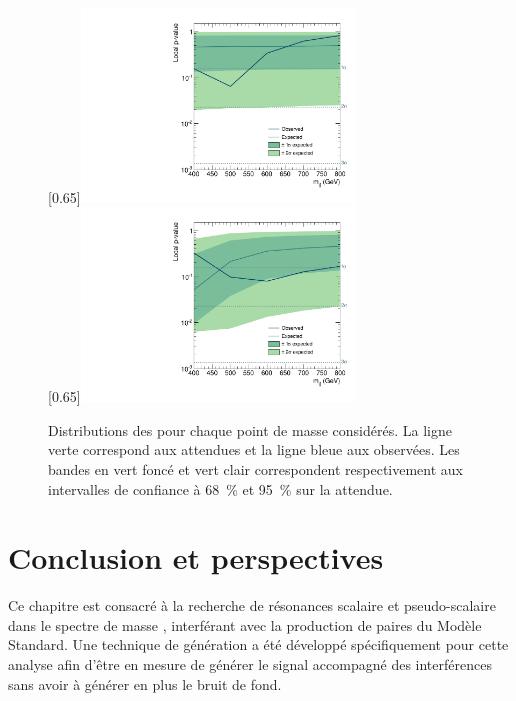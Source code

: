 \begin{figure}[tbp] \centering
    [0.65\textwidth]{\includegraphics[width=0.65\textwidth,angle=-90,origin=c]{chapitre8/figs/pvalues_scalar.pdf}} \\
    [0.65\textwidth]{\includegraphics[width=0.65\textwidth,angle=-90,origin=c]{chapitre8/figs/pvalues_pseudoscalar.pdf}}
    \caption{Distributions des \pvalues pour chaque point de masse considérés. La ligne verte correspond aux \pvalues attendues et la ligne bleue aux \pvalues observées. Les bandes en vert foncé et vert clair correspondent respectivement aux intervalles de confiance à \SI{68}{\percent} et \SI{95}{\percent} sur la \pvalue attendue.}
    \label{fig:pvalues_mass}
\end{figure}

\section{Conclusion et perspectives}

Ce chapitre est consacré à la recherche de résonances scalaire et pseudo-scalaire dans le spectre de masse \ttbar, interférant avec la production de paires \ttbar du Modèle Standard. Une technique de génération a été développé spécifiquement pour cette analyse afin d'être en mesure de générer le signal accompagné des interférences sans avoir à générer en plus le bruit de fond.

